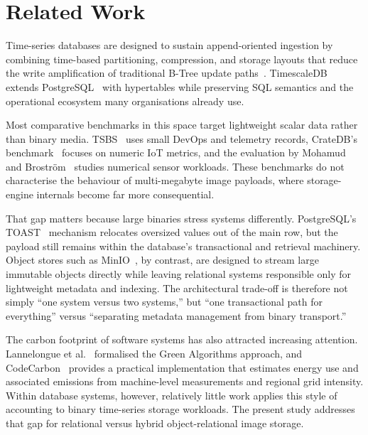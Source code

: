 \documentclass[conference]{IEEEtran}
\begin{document}
\section{Related Work}
\label{sec:related_work}

Time-series databases are designed to sustain append-oriented ingestion by combining time-based partitioning, compression, and storage layouts that reduce the write amplification of traditional B-Tree update paths~\cite{dewaal_timeseries_survey,jensen_tsms_survey}. TimescaleDB~\cite{timescaledb_official} extends PostgreSQL~\cite{postgresql_official} with hypertables while preserving SQL semantics and the operational ecosystem many organisations already use.

Most comparative benchmarks in this space target lightweight scalar data rather than binary media. TSBS~\cite{tsbs} uses small DevOps and telemetry records, CrateDB's benchmark~\cite{cratedb_ts_benchmark} focuses on numeric IoT metrics, and the evaluation by Mohamud and Brostr\"om~\cite{diva_timescaledb_mongodb_eval} studies numerical sensor workloads. These benchmarks do not characterise the behaviour of multi-megabyte image payloads, where storage-engine internals become far more consequential.

That gap matters because large binaries stress systems differently. PostgreSQL's TOAST~\cite{postgresql_toast_docs} mechanism relocates oversized values out of the main row, but the payload still remains within the database's transactional and retrieval machinery. Object stores such as MinIO~\cite{minio_official}, by contrast, are designed to stream large immutable objects directly while leaving relational systems responsible only for lightweight metadata and indexing. The architectural trade-off is therefore not simply ``one system versus two systems,'' but ``one transactional path for everything'' versus ``separating metadata management from binary transport.''

The carbon footprint of software systems has also attracted increasing attention. Lannelongue et al.~\cite{lannelongue_green_algorithms} formalised the Green Algorithms approach, and CodeCarbon~\cite{codecarbon} provides a practical implementation that estimates energy use and associated emissions from machine-level measurements and regional grid intensity. Within database systems, however, relatively little work applies this style of accounting to binary time-series storage workloads. The present study addresses that gap for relational versus hybrid object-relational image storage.
\end{document}
